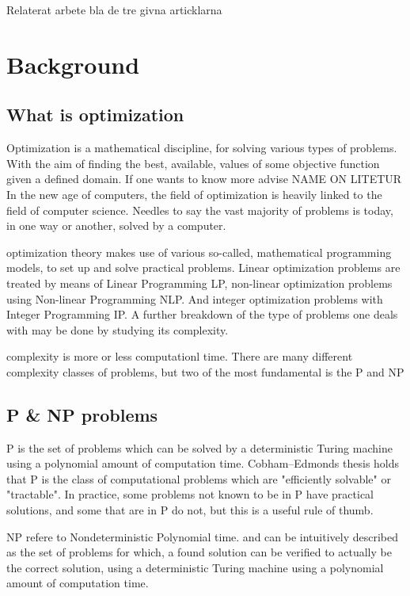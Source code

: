 Relaterat arbete bla de tre givna articklarna
 
\section{Background}
 
\subsection{What is optimization}
 
Optimization is a mathematical discipline, for solving various types of problems. With the aim of finding the best, available, values of some objective function given a defined domain. If one wants to know more advise NAME ON LITETUR\\
 
In the new age of computers, the field of optimization is heavily linked to the field of computer science. Needles to say the vast majority of problems is today, in one way or another, solved by a computer.
 
optimization theory makes use of various so-called, mathematical programming models, to set up and solve practical problems. Linear optimization problems are treated by means of Linear Programming LP, non-linear optimization problems using Non-linear Programming NLP. And integer optimization problems with Integer Programming IP.
A further breakdown of the type of problems one deals with may be done by studying its complexity.
 
complexity is more or less computationl time. There are many different complexity classes of problems, but two of the most fundamental is the P and NP
 
\subsection{P \& NP problems}
 
P is the set of problems which can be solved by a deterministic Turing machine using a polynomial amount of computation time.
Cobham–Edmonds thesis holds that P is the class of computational problems which are "efficiently solvable" or "tractable". In practice, some problems not known to be in P have practical solutions, and some that are in P do not, but this is a useful rule of thumb.
 
NP refere to Nondeterministic Polynomial time. and can be intuitively described as the set of problems for which, a found solution can be verified to actually be the correct solution, using a deterministic Turing machine using a polynomial amount of computation time.
 
